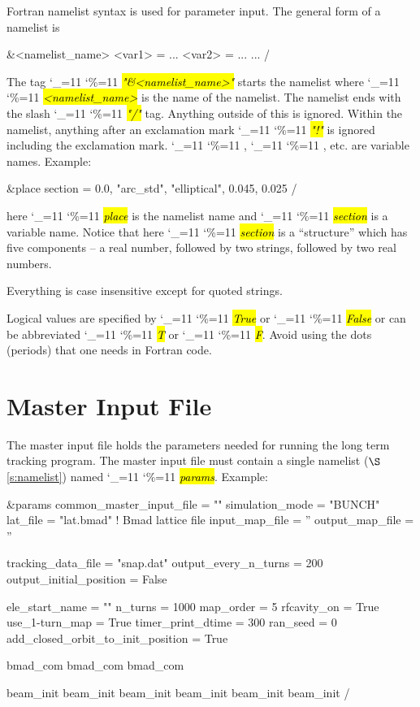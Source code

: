 \documentclass{hitec}
\newcommand\dottcmd[1]{\hl{\em#1}\endgroup}
\newcommand{\vn}{\begingroup\catcode`\_=11 \catcode`\%=11 \dottcmd}
\newcommand{\sref}[1]{$\S$\ref{#1}}
\newcommand{\Section}[1]{\section{#1}\vspace*{-1ex}}
\begin{document}
{{Fortran namelist syntax is used for parameter input. The
general form of a namelist is
\begin{code}
&<namelist_name>
  <var1> = ...
  <var2> = ...
  ...
/
\end{code}
The tag \vn{"\&<namelist_name>"} starts the namelist where
\vn{<namelist_name>} is the name of the namelist. The namelist ends
with the slash \vn{"/"} tag. Anything outside of this is
ignored. Within the namelist, anything after an exclamation mark
\vn{"!"} is ignored including the exclamation mark. \vn{<var1>},
\vn{<var2>}, etc. are variable names. Example:
\begin{code}
&place 
  section = 0.0, "arc_std", "elliptical", 0.045, 0.025 
/
\end{code}
here \vn{place} is the namelist name and \vn{section} is a
variable name.  Notice that here \vn{section} is a ``structure'' which
has five components -- a real number, followed by two strings,
followed by two real numbers.

Everything is case insensitive except for quoted strings.

Logical values are specified by \vn{True} or \vn{False} or can be
abbreviated \vn{T} or \vn{F}. Avoid using the dots (periods) that one
needs in Fortran code.

\Section{Master Input File}
\label{s:input}

The master input file holds the parameters needed for running the long term tracking program. The
master input file must contain a single namelist (\sref{s:namelist}) named \vn{params}.  Example:
\begin{code}
&params
  common_master_input_file = ""
  simulation_mode = "BUNCH"
  lat_file   =  "lat.bmad"     ! Bmad lattice file
  input_map_file = ''
  output_map_file = ''

  tracking_data_file  = "snap.dat"
  output_every_n_turns = 200
  output_initial_position = False

  ele_start_name     = ""
  n_turns            = 1000
  map_order          = 5
  rfcavity_on        = True
  use_1-turn_map     = True
  timer_print_dtime  = 300
  ran_seed           = 0
  add_closed_orbit_to_init_position = True

  bmad_com%
  bmad_com%
  bmad_com%

  beam_init%
  beam_init%
  beam_init%
  beam_init%
  beam_init%
  beam_init%
/
\end{code}

}}
\end{document}
